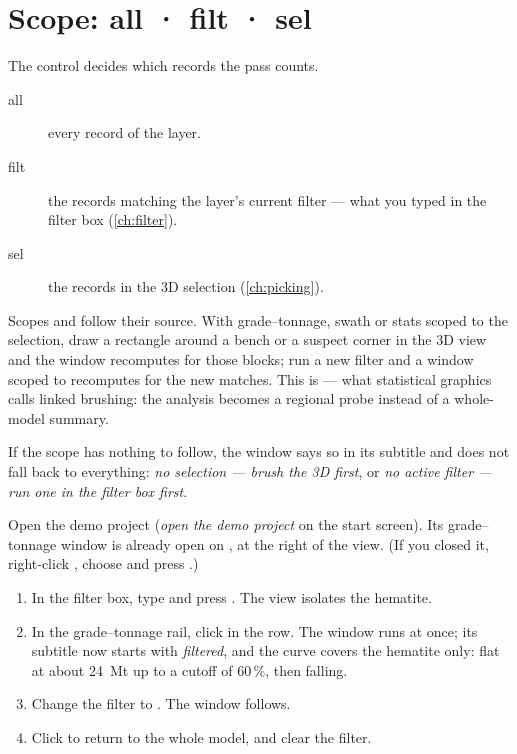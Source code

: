 \section{Scope: all · filt · sel}\label{sec:analysis-scope}
The  control decides which records the pass counts.

\begin{description}
\item[all] every record of the layer.
\item[filt] the records matching the layer's current filter — what you typed in the filter box (\cref{ch:filter}).
\item[sel] the records in the 3D selection (\cref{ch:picking}).
\end{description}

Scopes  and  follow their source. With grade–tonnage, swath or stats scoped to the selection, draw a rectangle around a bench or a suspect corner in the 3D view and the window recomputes for those blocks; run a new filter and a window scoped to  recomputes for the new matches. This is  — what statistical graphics calls linked brushing: the analysis becomes a regional probe instead of a whole-model summary.

If the scope has nothing to follow, the window says so in its subtitle and does not fall back to everything: \emph{no selection — brush the 3D first}, or \emph{no active filter — run one in the filter box first}.

\begin{tryit}
Open the demo project (\emph{open the demo project} on the start screen). Its grade–tonnage window is already open on , at the right of the view. (If you closed it, right-click , choose  and press .)
\begin{enumerate}
\item In the filter box, type  and press . The view isolates the hematite.
\item In the grade–tonnage rail, click  in the  row. The window runs at once; its subtitle now starts with \emph{filtered}, and the curve covers the hematite only: flat at about 24~Mt up to a cutoff of 60\,\%, then falling.
\item Change the filter to . The window follows.
\item Click  to return to the whole model, and clear the filter.
\end{enumerate}
\end{tryit}


